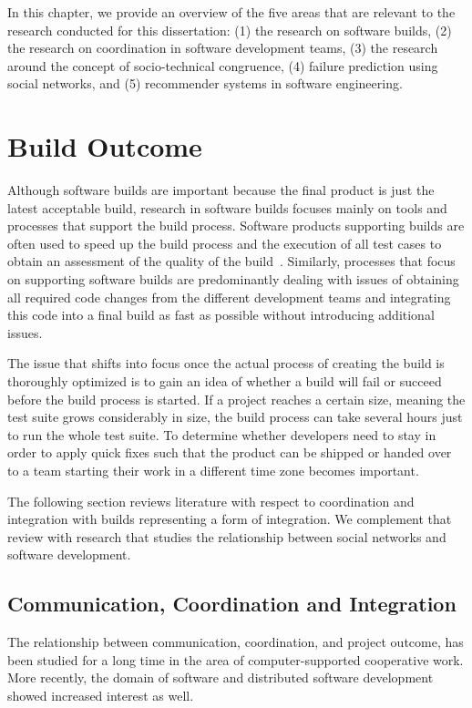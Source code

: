 \label{chap:bg}
In this chapter, we provide an overview of the five areas that are relevant to the research conducted for this dissertation: (1) the research on software builds, (2) the research on coordination in software development teams, (3) the research around the concept of socio-technical congruence, (4) failure prediction using social networks, and (5) recommender systems in software engineering.

\section{Build Outcome}
\label{sec:RelatedCommunication}
Although software builds are important because the final product is just the latest acceptable build, research in software builds focuses mainly on tools and processes that support the build process.
Software products supporting builds are often used to speed up the build process and the execution of all test cases to obtain an assessment of the quality of the build~\cite{maraia:book:2005}.
Similarly, processes that focus on supporting software builds are predominantly dealing with issues of obtaining all required code changes from the different development teams and integrating this code into a final build as fast as possible without introducing additional issues.

The issue that shifts into focus once the actual process of creating the build is thoroughly optimized is to gain an idea of whether a build will fail or succeed before the build process is started.
If a project reaches a certain size, meaning the test suite grows considerably in size, the build process can take several hours just to run the whole test suite.
To determine whether developers need to stay in order to apply quick fixes such that the product can be shipped or handed over to a team starting their work in a different time zone becomes important.

The following section reviews literature with respect to coordination and integration with builds representing a form of integration.
We complement that review with research that studies the relationship between social networks and software development.

\subsection{Communication, Coordination and Integration}
The relationship between communication, coordination, and project outcome, has been
studied for a long time in the area of computer-supported cooperative work. More
recently, the domain of software and distributed software development showed
increased interest as well.

